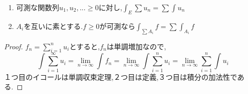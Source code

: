 \begin{prop}[項別積分定理]
 \begin{enumerate}
     \item 可測な関数列$u_1, u_2, ... \ge 0$に対し,$\int_E \sum u_n = \sum \int u_n$
     \item $A_i$を互いに素とする.$f \ge 0$が可測なら$\int_{\sum A_i} f = \sum \int_{A_i} f$
\end{enumerate}
\end{prop}
\begin{proof}
$f_n = \sum_{i=1}^n u_i$とすると,$f_n$は単調増加なので,
\begin{equation*}
\int \sum_{i=1}^{\infty} u_i = \lim_{n \to \infty} \int f_n = \lim_{n \to \infty} \int \sum_{i=1}^n u_i = \lim_{n \to \infty} \sum_{i=1}^n \int u_i 
\end{equation*}
１つ目のイコールは単調収束定理,２つ目は定義,３つ目は積分の加法性である.
\end{proof}

